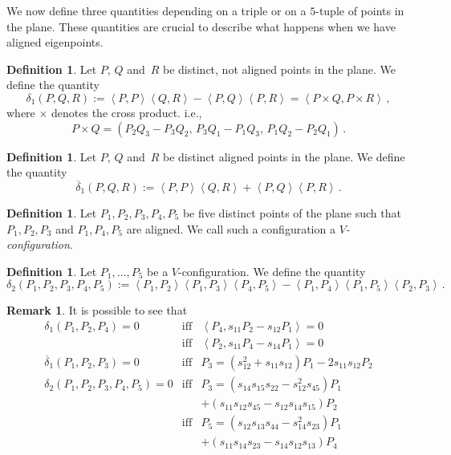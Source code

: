 \documentclass[11pt, a4paper, reqno, captions=tableheading,bibliography=totoc]{scrartcl}
\theoremstyle{plain}
\theoremstyle{definition}
\newtheorem{definition}[lemma]{Definition}
\newtheorem{rmk}[lemma]{Remark}
\newcommand{\scl}[2]{\left\langle {#1}, {#2} \right\rangle}
\begin{document}
We now define three quantities depending on a triple or on a $5$-tuple of points in the plane.
These quantities are crucial to describe what happens when we have aligned eigenpoints.

\begin{definition}
\label{definition:delta1}
 Let $P$, $Q$ and~$R$ be distinct, not aligned points in the plane.
 We define the quantity
 \[
  \delta_1(P, Q, R) :=
  \scl{P}{P} \scl{Q}{R} - \scl{P}{Q}\scl{P}{R}
  =
  \scl{P\times Q}{P \times R} \,,
 \]
 where $\times$ denotes the cross product. i.e.,
 \[
  P \times Q = (P_2 Q_3 - P_3 Q_2, \, P_3 Q_1 - P_1 Q_3, \, P_1 Q_2 - P_2 Q_1) \,.
 \]

\end{definition}

\begin{definition}
\label{definition:delta1b}
 Let $P$, $Q$ and~$R$ be distinct aligned points in the plane.
 We define the quantity
 \[
  \overline{\delta}_1(P, Q, R) :=
  \scl{P}{P} \scl{Q}{R} + \scl{P}{Q}\scl{P}{R} \,.
  \]
\end{definition}

\begin{definition}
\label{Vconf}
Let $P_1, P_2, P_3, P_4, P_5$ be five distinct points of the plane
such that $P_1, P_2, P_3$ and $P_1, P_4, P_5$ are aligned.
We call such a configuration a \emph{$V$-configuration}.
\end{definition}


\begin{definition}
 Let $P_1, \dots, P_5$ be a $V$-configuration.
We define the quantity
 \[
  \delta_2(P_1, P_2, P_3, P_4, P_5) :=
  \scl{P_1}{P_2} \scl{P_1}{P_3} \scl{P_4}{P_5} -
  \scl{P_1}{P_4} \scl{P_1}{P_5} \scl{P_2}{P_3} \,.
 \]
\end{definition}
\begin{rmk}
It is possible to see that 
\begin{eqnarray}
\label{rmk_delta_1}
\delta_1(P_1, P_2, P_4) = 0  &\mbox{iff} &\scl{P_4}{s_{11}P_2-s_{12}P_1} = 0\\
&\mbox{iff} &\scl{P_2}{s_{11}P_4-s_{14}P_1} = 0\\
\label{rmk_delta_2}
\overline{\delta}_1(P_1, P_2, P_3) = 0 &\mbox{iff}&
P_3 = (s_{12}^2+s_{11}s_{12})P_1-2s_{11}s_{12}P_2\\
\label{rmk_delta_3}
\delta_2(P_1, P_2, P_3, P_4, P_5) = 0 & \mbox{iff} 
&P_3 = (s_{14}s_{15}s_{22}-s_{12}^2s_{45})P_1 \nonumber \\
&& +(s_{11}s_{12}s_{45}-s_{12}s_{14}s_{15})P_2\\
& \mbox{iff} &
P_5 = (s_{12}s_{13}s_{44}-s_{14}^2s_{23})P_1 \nonumber \\
&& +(s_{11}s_{14}s_{23}-s_{14}s_{12}s_{13})P_4 \nonumber
\end{eqnarray}
\end{rmk}
\end{document}
